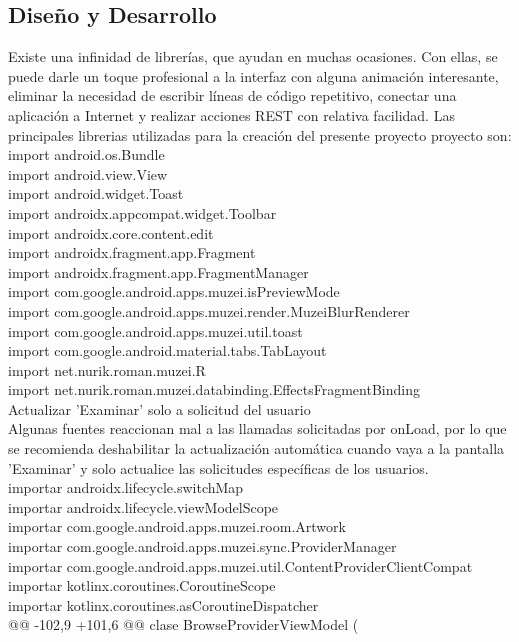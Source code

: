 \documentclass[12pt,a4paper]{article}
\begin{document}
\subsection{Diseño y Desarrollo}
Existe una infinidad de librerías, que ayudan en muchas ocasiones. Con ellas, se puede darle un toque profesional a la interfaz con alguna animación interesante, eliminar la necesidad de escribir líneas de código repetitivo, conectar una aplicación a Internet y realizar acciones REST con relativa facilidad. Las principales librerias utilizadas para la creación del presente proyecto proyecto son:\\
import android.os.Bundle\\
import android.view.View\\
import android.widget.Toast\\
import androidx.appcompat.widget.Toolbar\\
import androidx.core.content.edit\\
import androidx.fragment.app.Fragment\\
import androidx.fragment.app.FragmentManager\\
import com.google.android.apps.muzei.isPreviewMode\\
import com.google.android.apps.muzei.render.MuzeiBlurRenderer\\
import com.google.android.apps.muzei.util.toast\\
import com.google.android.material.tabs.TabLayout\\
import net.nurik.roman.muzei.R\\
import net.nurik.roman.muzei.databinding.EffectsFragmentBinding\\

Actualizar 'Examinar' solo a solicitud del usuario\\

Algunas fuentes reaccionan mal a las llamadas solicitadas por onLoad, por lo que se recomienda deshabilitar la actualización automática cuando vaya a la pantalla 'Examinar' y solo actualice las solicitudes específicas de los usuarios.\\
importar  androidx.lifecycle.switchMap\\
importar  androidx.lifecycle.viewModelScope\\
importar  com.google.android.apps.muzei.room.Artwork\\
importar  com.google.android.apps.muzei.sync.ProviderManager\\
importar  com.google.android.apps.muzei.util.ContentProviderClientCompat\\
importar  kotlinx.coroutines.CoroutineScope\\
importar  kotlinx.coroutines.asCoroutineDispatcher\\
@@ -102,9 +101,6 @@ clase BrowseProviderViewModel (\\
\end{document}
